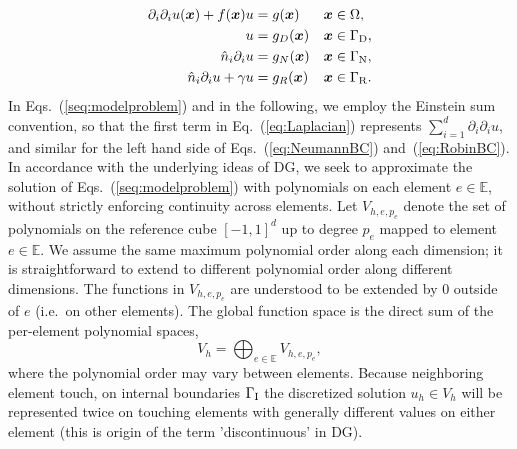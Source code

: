 \begin{subequations}\label{seq:modelproblem}
  \begin{align}
    \label{eq:Laplacian}
    \partial_i\partial_i u(\boldsymbol{x}) + f(\boldsymbol{x})u &= g( \boldsymbol{x} )
    && \boldsymbol{x} \in \Omega, \\
           u &= g_D(\boldsymbol{x})
    && \boldsymbol{x} \in  \Gamma_{\rm D},\\ 
           \label{eq:NeumannBC}
           \Hat n_i\partial_i u &= g_N(\boldsymbol{x})
           && \boldsymbol{x}\in  \Gamma_{\rm N},  \\
           \Hat n_i\partial_i u + \gamma u &= g_R(\boldsymbol{x}) && \boldsymbol{x}\in  \Gamma_{\rm R}.
\label{eq:RobinBC}
  \end{align}
\end{subequations}
%
In Eqs.~(\ref{seq:modelproblem}) and in the following, we employ the
Einstein sum convention, so that the first term in
Eq.~(\ref{eq:Laplacian}) represents $\sum_{i=1}^d\partial_i\partial_iu$, and similar for the left hand side of Eqs.~(\ref{eq:NeumannBC})
and~(\ref{eq:RobinBC}).
In accordance with the underlying ideas of DG, we seek to approximate the
  solution of Eqs.~(\ref{seq:modelproblem}) with polynomials on each element $e\in \mathbb{E}$, without strictly enforcing continuity across elements. 
  Let $V_{h,e,p_e}$ denote the set of polynomials 
  on the reference cube $[-1,1]^d$ up to degree $p_e$ mapped to element $e\in \mathbb{E}$.
We assume the same maximum polynomial order along each dimension; it is straightforward to extend to different polynomial order along different dimensions.
  The functions in $V_{h,e,p_e}$ are understood to be extended by $0$ outside of $e$ (i.e.\ on other elements).   The global function space is the direct sum of the per-element polynomial spaces,
  \begin{equation}
    \label{eq:Vh}
    V_h = \bigoplus_{e \in \mathbb{E}}V_{h,e,p_e},
  \end{equation}
  where the polynomial order may vary between elements.
  Because
  neighboring element touch, on internal boundaries $\Gamma_{\rm I}$
  the discretized solution $u_h\in V_h$ will be represented
  twice on touching elements with generally different values on either element
  (this is origin of the term 'discontinuous' in DG).

